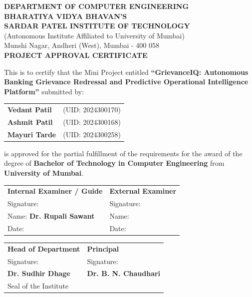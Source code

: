 \newpage
\thispagestyle{empty}
\vspace*{0.2cm}
\begin{center}
\large\textbf{DEPARTMENT OF COMPUTER ENGINEERING}\\
\textbf{BHARATIYA VIDYA BHAVAN'S}\\
\textbf{SARDAR PATEL INSTITUTE OF TECHNOLOGY}\\
\small{(Autonomous Institute Affiliated to University of Mumbai)}\\
\small{Munshi Nagar, Andheri (West), Mumbai - 400 058}\\
\vspace{0.6cm}
\Large\textbf{PROJECT APPROVAL CERTIFICATE}
\end{center}
\vspace{0.8cm}

\noindent This is to certify that the Mini Project entitled \textbf{``GrievanceIQ: Autonomous Banking Grievance Redressal and Predictive Operational Intelligence Platform''} submitted by:
\begin{center}
\begin{tabular}{ll}
\textbf{Vedant Patil} & (UID: 2024300170) \\
\textbf{Ashmit Patil} & (UID: 2024300168) \\
\textbf{Mayuri Tarde} & (UID: 2024300258) \\
\end{tabular}
\end{center}
\noindent is approved for the partial fulfillment of the requirements for the award of the degree of \textbf{Bachelor of Technology in Computer Engineering} from \textbf{University of Mumbai}.

\vspace{2.5cm}

\noindent
\begin{tabular}{p{7.5cm}p{7.5cm}}
\textbf{Internal Examiner / Guide} & \textbf{External Examiner} \\
Signature: \hrulefill & Signature: \hrulefill \\
Name: \textbf{Dr. Rupali Sawant} & Name: \hrulefill \\
Date: \hrulefill & Date: \hrulefill \\
\end{tabular}

\vspace{3cm}

\noindent
\begin{tabular}{p{7.5cm}p{7.5cm}}
\textbf{Head of Department} & \textbf{Principal} \\
Signature: \hrulefill & Signature: \hrulefill \\
\textbf{Dr. Sudhir Dhage} & \textbf{Dr. B. N. Chaudhari} \\
Seal of the Institute & \\
\end{tabular}
